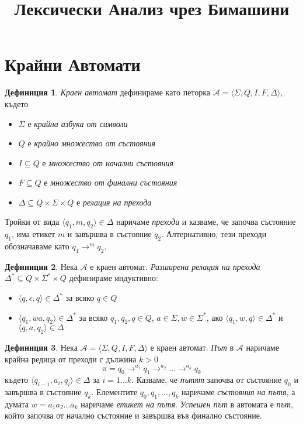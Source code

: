 \documentclass[11pt, oneside]{article}   	%
\title{Лексически Анализ чрез Бимашини}
\theoremstyle{definition}
\newtheorem{definition}{Дефиниция}[section]
\begin{document}

\section{Крайни Автомати}

\begin{definition}
	\emph{Краен автомат} дефинираме като петорка \( \mathcal{A} = \langle \Sigma, Q, I, F, \Delta \rangle \), където

	\begin{itemize}
		\item \( \Sigma \) е \emph{крайна азбука от символи}
		\item \( Q \) е \emph{крайно множество от състояния}
		\item \( I \subseteq Q \) е \emph{множество от начални състояния}
		\item \( F \subseteq Q \) е \emph{множество от финални състояния}
		\item \( \Delta \subseteq Q \times \Sigma \times Q \) е \emph{релация на прехода}
	\end{itemize}
 
	Тройки от вида \( \langle q_1, m, q_2 \rangle \in \Delta \) наричаме \emph{преходи} и казваме, че започва състояние \( q_1 \), има етикет \( m \) и завършва в състояние \( q_2 \). Алтернативно, тези преходи обозначаваме като \( q_1 \to^m q_2 \).
\end{definition}

\begin{definition}  
	Нека \( \mathcal{A} \) е краен автомат. \emph{Разширена релация на прехода} \( \Delta^* \subseteq Q \times \Sigma^* \times Q \) дефинираме индуктивно:

	\begin{itemize}
		\item \( \langle q, \epsilon, q \rangle \in \Delta^* \) за всяко \( q \in Q \)
		\item \( \langle q_1, wa, q_2 \rangle \in \Delta^* \) за всяко \( q_1, q_2, q \in Q \), \( a \in \Sigma, w \in \Sigma^* \), ако \( \langle q_1, w, q \rangle \in \Delta^* \) и \( \langle q, a, q_2 \rangle \in \Delta \)
	\end{itemize}
\end{definition}

\begin{definition} 
	Нека \( \mathcal{A} = \langle \Sigma, Q, I, F, \Delta \rangle \) е краен автомат. \emph{Път} в \( \mathcal{A} \) наричаме крайна редица от преходи с дължина \( k > 0 \) \[ \pi = q_0 \to^{a_1} q_1 \to^{a_2} \ldots \to^{a_k} q_k \] където \( \langle q_{i-1}, a_i, q_i \rangle \in \Delta \) за \( i = 1 \ldots k \). Казваме, че \emph{пътят} започва от състояние \( q_0 \) и завършва в състояние \( q_k \). Елементите \( q_0,q_1, \ldots ,q_k \) наричаме \emph{състояния на пътя}, а думата \( w = a_1 a_2 \ldots a_k \) наричаме \emph{етикет на пътя}. \newline \emph{Успешен път} в автомата е \emph{път}, който започва от начално състояние и завършва във финално състояние.
\end{definition}
\end{document}
